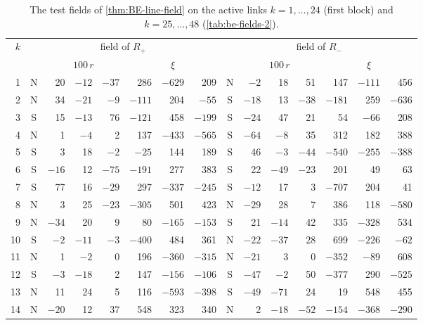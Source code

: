 \documentclass[11pt,a4paper]{amsart}
\theoremstyle{definition}
\theoremstyle{remark}
\numberwithin{equation}{section}
\begin{document}
\begin{table}[!htbp]
\centering
\caption{The test fields of \cref{thm:BE-line-field} on the active links $k=1,\dots,24$ (first block) and $k=25,\dots,48$ (\cref{tab:be-fields-2}).}\label{tab:be-fields-1}
\scriptsize\setlength{\tabcolsep}{2.4pt}\renewcommand{\arraystretch}{1.0}
\begin{tabular}{@{}r@{\quad}c*{6}{r}@{\quad}c*{6}{r}@{}}
\toprule
$k$ & \multicolumn{7}{c}{field of $R_+$} & \multicolumn{7}{c}{field of $R_-$}\\
\cmidrule(lr){2-8}\cmidrule(l){9-15}
 & & \multicolumn{3}{c}{$100\,r$} & \multicolumn{3}{c}{$\xi$} & & \multicolumn{3}{c}{$100\,r$} & \multicolumn{3}{c}{$\xi$}\\
\midrule
1 & N & 20 & $-12$ & $-37$ & 286 & $-629$ & 209 & N & $-2$ & 18 & 51 & 147 & $-111$ & 456\\
2 & N & 34 & $-21$ & $-9$ & $-111$ & 204 & $-55$ & S & $-18$ & 13 & $-38$ & $-181$ & 259 & $-636$\\
3 & S & 15 & $-13$ & 76 & $-121$ & 458 & $-199$ & S & $-24$ & 47 & 21 & 54 & $-66$ & 208\\
4 & N & 1 & $-4$ & 2 & 137 & $-433$ & $-565$ & S & $-64$ & $-8$ & 35 & 312 & 182 & 388\\
5 & S & 3 & 18 & $-2$ & $-25$ & 144 & 189 & S & 46 & $-3$ & $-44$ & $-540$ & $-255$ & $-388$\\
6 & S & $-16$ & 12 & $-75$ & $-191$ & 277 & 383 & S & 22 & $-49$ & $-23$ & 201 & 49 & 63\\
7 & S & 77 & 16 & $-29$ & 297 & $-337$ & $-245$ & S & $-12$ & 17 & 3 & $-707$ & 204 & 41\\
8 & N & 3 & 25 & $-23$ & $-305$ & 501 & 423 & N & $-29$ & 28 & 7 & 386 & 118 & $-580$\\
9 & N & $-34$ & 20 & 9 & 80 & $-165$ & $-153$ & S & 21 & $-14$ & 42 & 335 & $-328$ & 534\\
10 & S & $-2$ & $-11$ & $-3$ & $-400$ & 484 & 361 & N & $-22$ & $-37$ & 28 & 699 & $-226$ & $-62$\\
11 & N & 1 & $-2$ & 0 & 196 & $-360$ & $-315$ & N & $-21$ & 3 & 0 & $-352$ & $-89$ & 608\\
12 & S & $-3$ & $-18$ & 2 & 147 & $-156$ & $-106$ & S & $-47$ & $-2$ & 50 & $-377$ & 290 & $-525$\\
13 & N & 11 & 24 & 5 & 116 & $-593$ & $-398$ & S & $-49$ & $-71$ & 24 & 19 & 548 & 455\\
14 & N & $-20$ & 12 & 37 & 548 & 323 & 340 & N & 2 & $-18$ & $-52$ & $-154$ & $-368$ & $-290$\\

\end{tabular}
\end{table}
\end{document}
